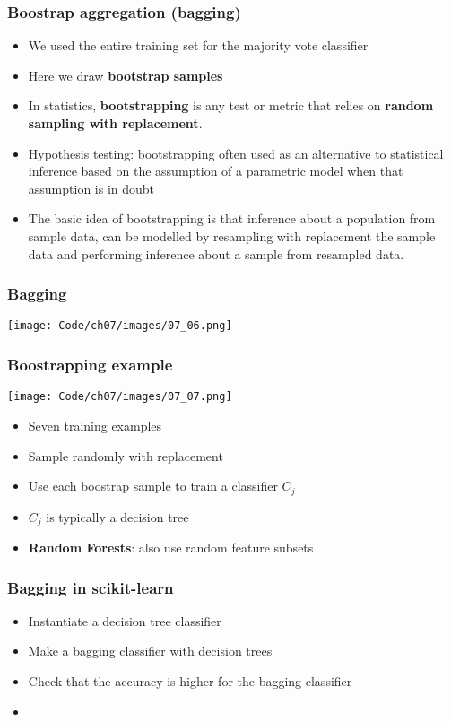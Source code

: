 \documentclass{beamer}
\begin{document}
\begin{frame}
  \frametitle{Boostrap aggregation (bagging)}
  \begin{itemize}
  \item We used the entire training set for the majority vote classifier
  \item Here we draw \textbf{bootstrap samples}
  \item In statistics, \textbf{bootstrapping} is any test or metric that relies on \textbf{random sampling with replacement}.
  \item Hypothesis testing: bootstrapping often used as an alternative to statistical inference based on the assumption of a parametric model when that assumption is in doubt
  \item The basic idea of bootstrapping is that inference about a population from sample data, can be modelled by resampling with replacement the sample data and performing inference about a sample from resampled data.
  \end{itemize}
\end{frame}

\begin{frame}
  \frametitle{Bagging}
  \center
  \texttt{[image: Code/ch07/images/07\_06.png]}
\end{frame}

\begin{frame}
  \frametitle{Boostrapping example}
  \center
  \texttt{[image: Code/ch07/images/07\_07.png]}
  \begin{itemize}
  \item Seven training examples
  \item Sample randomly with replacement
  \item Use each boostrap sample to train a classifier $C_j$
  \item $C_j$ is typically a decision tree
  \item \textbf{Random Forests}: also use random feature subsets
  \end{itemize}

\end{frame}

\begin{frame}
  \frametitle{Bagging in scikit-learn}
  \begin{itemize}
  \item Instantiate a decision tree classifier
  \item Make a bagging classifier with decision trees
  \item Check that the accuracy is higher for the bagging classifier
  \item \href{https://github.com/rasbt/python-machine-learning-book/blob/master/code/ch07/ch07.ipynb}{}
  \end{itemize}
\end{frame}
\end{document}
